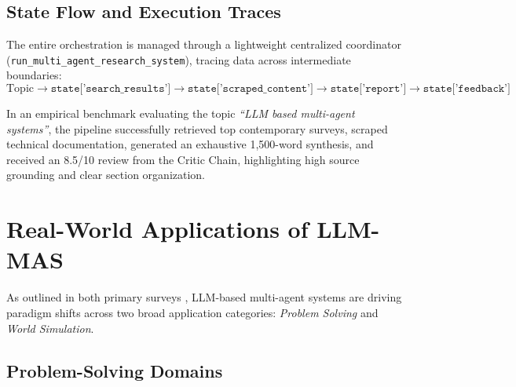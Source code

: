 \documentclass[12pt,a4paper]{report}
\begin{document}
\section{State Flow and Execution Traces}
The entire orchestration is managed through a lightweight centralized coordinator (\texttt{run\_multi\_agent\_research\_system}), tracing data across intermediate boundaries:
\begin{equation}
\text{Topic} \xrightarrow{} \texttt{state['search\_results']} \xrightarrow{} \texttt{state['scraped\_content']} \xrightarrow{} \texttt{state['report']} \xrightarrow{} \texttt{state['feedback']}
\end{equation}

In an empirical benchmark evaluating the topic \textit{``LLM based multi-agent systems''}, the pipeline successfully retrieved top contemporary surveys, scraped technical documentation, generated an exhaustive 1,500-word synthesis, and received an 8.5/10 review from the Critic Chain, highlighting high source grounding and clear section organization.


\chapter{Real-World Applications of LLM-MAS}
\label{chap:applications}

As outlined in both primary surveys \cite{li2024survey, guo2024large}, LLM-based multi-agent systems are driving paradigm shifts across two broad application categories: \textit{Problem Solving} and \textit{World Simulation}.

\section{Problem-Solving Domains}
\end{document}
